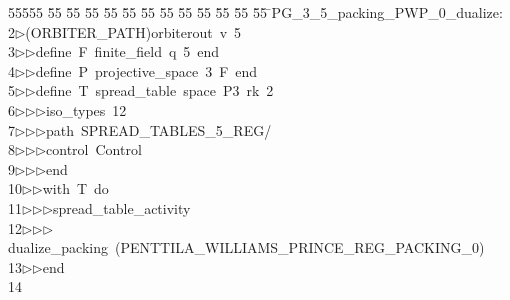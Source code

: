 %
%
\begin{tabbing}
55555 \= 55 \= 55 \= 55 \= 55 \= 55 \= 55 \= 55 \= 55 \= 55 \= 55 \= 55 \= 55 \= \>PG\_3\_5\_packing\_PWP\_0\_dualize:\\[0pt]
2\>$\triangleright$\>(ORBITER\_PATH)orbiterout\ v\ 5\ \\[0pt]
3\>$\triangleright$\>$\triangleright$\>define\ F\ finite\_field\ q\ 5\ end\ \\[0pt]
4\>$\triangleright$\>$\triangleright$\>define\ P\ projective\_space\ 3\ F\ end\ \\[0pt]
5\>$\triangleright$\>$\triangleright$\>define\ T\ spread\_table\ space\ P3\ rk\ 2\ \\[0pt]
6\>$\triangleright$\>$\triangleright$\>$\triangleright$\>iso\_types\ 12\ \\[0pt]
7\>$\triangleright$\>$\triangleright$\>$\triangleright$\>path\ SPREAD\_TABLES\_5\_REG/\ \\[0pt]
8\>$\triangleright$\>$\triangleright$\>$\triangleright$\>control\ Control\ \\[0pt]
9\>$\triangleright$\>$\triangleright$\>$\triangleright$\>end\ \\[0pt]
10\>$\triangleright$\>$\triangleright$\>with\ T\ do\ \\[0pt]
11\>$\triangleright$\>$\triangleright$\>$\triangleright$\>spread\_table\_activity\ \\[0pt]
12\>$\triangleright$\>$\triangleright$\>$\triangleright$\>dualize\_packing\ (PENTTILA\_WILLIAMS\_PRINCE\_REG\_PACKING\_0)\ \\[0pt]
13\>$\triangleright$\>$\triangleright$\>end\ \\[0pt]
14\>\end{tabbing}
